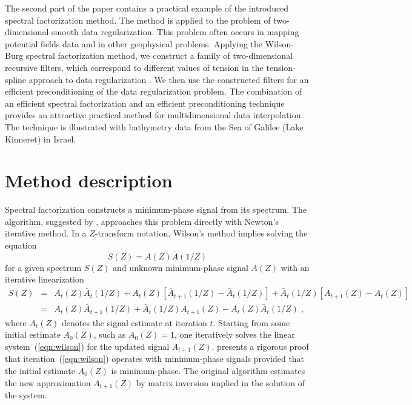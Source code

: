 The second part of the paper contains a practical example of the
introduced spectral factorization method. The method is applied to the
problem of two-dimensional smooth data regularization. This problem
often occurs in mapping potential fields data and in other geophysical
problems. Applying the Wilson-Burg spectral factorization method, we
construct a family of two-dimensional recursive filters, which
correspond to different values of tension in the tension-spline
approach to data regularization \cite[]{GEO55-03-02930305}. We then use
the constructed filters for an efficient preconditioning of the data
regularization problem. The combination of an efficient spectral factorization
and an efficient preconditioning technique provides an attractive practical
method for multidimensional data interpolation. The technique is illustrated
with bathymetry data from the Sea of Galilee (Lake Kinneret) in Israel.

\section{Method description}

Spectral factorization constructs a minimum-phase signal from its
spectrum.  The algorithm, suggested by \cite{mywilson}, approaches
this problem directly with Newton's iterative method. In a
$Z$-transform notation, Wilson's method implies solving the equation
\begin{equation}
S(Z) = A(Z)\bar{A}(1/Z)
\label{eqn:specfac}
\end{equation}
for a given spectrum $S(Z)$ and unknown minimum-phase signal $A(Z)$
with an iterative linearization
\begin{eqnarray}
\nonumber
S(Z) & = & A_t(Z)\bar A_t(1/Z)+
     A_t(  Z)[\bar A_{t+1}(1/Z)-\bar A_t(1/Z)]+
\bar A_t(1/Z)[     A_{t+1}(  Z)-     A_t(  Z)] \\
& = & A_t(  Z) \bar A_{t+1}(1/Z) + \bar A_t(1/Z) A_{t+1}(Z)
- A_t(Z)\bar A_t(1/Z)
\;,
\label{eqn:wilson}
\end{eqnarray}
where $A_t(Z)$ denotes the signal estimate at iteration $t$. Starting
from some initial estimate $A_0(Z)$, such as $A_0(Z)=1$, one
iteratively solves the linear system~(\ref{eqn:wilson}) for the
updated signal $A_{t+1}(Z)$. \cite{mywilson} presents a rigorous proof
that iteration~(\ref{eqn:wilson}) operates with minimum-phase signals
provided that the initial estimate $A_0(Z)$ is minimum-phase. The
original algorithm estimates the new approximation $A_{t+1}(Z)$ by
matrix inversion implied in the solution of the system.

